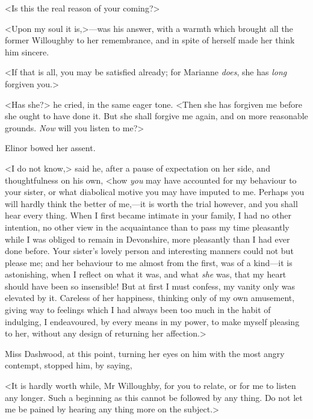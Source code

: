 <Is this the real reason of your coming?>

<Upon my soul it is,>—was his answer, with a warmth which brought all the former Willoughby to her remembrance, and in spite of herself made her think him sincere.

<If that is all, you may be satisfied already; for Marianne \textit{does}, she has \textit{long} forgiven you.>

<Has she?> he cried, in the same eager tone. <Then she has forgiven me before she ought to have done it. But she shall forgive me again, and on more reasonable grounds. \textit{Now} will you listen to me?>

Elinor bowed her assent.

<I do not know,> said he, after a pause of expectation on her side, and thoughtfulness on his own, <how \textit{you} may have accounted for my behaviour to your sister, or what diabolical motive you may have imputed to me. Perhaps you will hardly think the better of me,—it is worth the trial however, and you shall hear every thing. When I first became intimate in your family, I had no other intention, no other view in the acquaintance than to pass my time pleasantly while I was obliged to remain in Devonshire, more pleasantly than I had ever done before. Your sister's lovely person and interesting manners could not but please me; and her behaviour to me almost from the first, was of a kind—it is astonishing, when I reflect on what it was, and what \textit{she} was, that my heart should have been so insensible! But at first I must confess, my vanity only was elevated by it. Careless of her happiness, thinking only of my own amusement, giving way to feelings which I had always been too much in the habit of indulging, I endeavoured, by every means in my power, to make myself pleasing to her, without any design of returning her affection.>

Miss Dashwood, at this point, turning her eyes on him with the most angry contempt, stopped him, by saying,

<It is hardly worth while, Mr Willoughby, for you to relate, or for me to listen any longer. Such a beginning as this cannot be followed by any thing. Do not let me be pained by hearing any thing more on the subject.>

